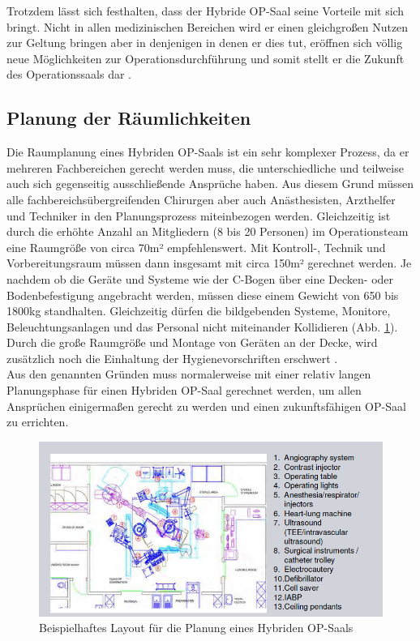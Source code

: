 Trotzdem lässt sich festhalten, dass der Hybride OP-Saal seine Vorteile mit sich bringt. Nicht in allen medizinischen Bereichen wird er einen gleichgroßen Nutzen zur Geltung bringen aber in denjenigen in denen er dies tut, eröffnen sich völlig neue Möglichkeiten zur Operationsdurchführung und somit stellt er die Zukunft des Operationssaals dar \cite{ORofTheFuture}.

\subsection{Planung der Räumlichkeiten}

Die Raumplanung eines Hybriden OP-Saals ist ein sehr komplexer Prozess, da er mehreren Fachbereichen gerecht werden muss, die unterschiedliche und teilweise auch sich gegenseitig ausschließende Ansprüche haben. Aus diesem Grund müssen alle fachbereichsübergreifenden Chirurgen aber auch Anästhesisten, Arzthelfer und Techniker in den Planungsprozess miteinbezogen werden.
Gleichzeitig ist durch die erhöhte Anzahl an Mitgliedern (8 bis 20 Personen) im Operationsteam eine Raumgröße von circa 70m² empfehlenswert. Mit Kontroll-, Technik und Vorbereitungsraum müssen dann insgesamt mit circa 150m² gerechnet werden. Je nachdem ob die Geräte und Systeme wie der C-Bogen über eine Decken- oder Bodenbefestigung angebracht werden, müssen diese einem Gewicht von 650 bis 1800kg standhalten. Gleichzeitig dürfen die bildgebenden Systeme, Monitore, Beleuchtungsanlagen und das Personal nicht miteinander Kollidieren (Abb. \ref{fig:roomplanning}). Durch die große Raumgröße und Montage von Geräten an der Decke, wird zusätzlich noch die Einhaltung der Hygienevorschriften erschwert \cite{TechnicalConsiderations}.\\ 
Aus den genannten Gründen muss normalerweise mit einer relativ langen Planungsphase für einen Hybriden OP-Saal gerechnet werden, um allen Ansprüchen einigermaßen gerecht zu werden und einen zukunftsfähigen OP-Saal zu errichten.

\begin{figure} [H]
	\includegraphics[scale = 0.7]{Content/Pictures/roomplanning.png}
	\caption{Beispielhaftes Layout für die Planung eines Hybriden OP-Saals \cite{HybridOR}}
	\label{fig:roomplanning}
\end{figure}


 





